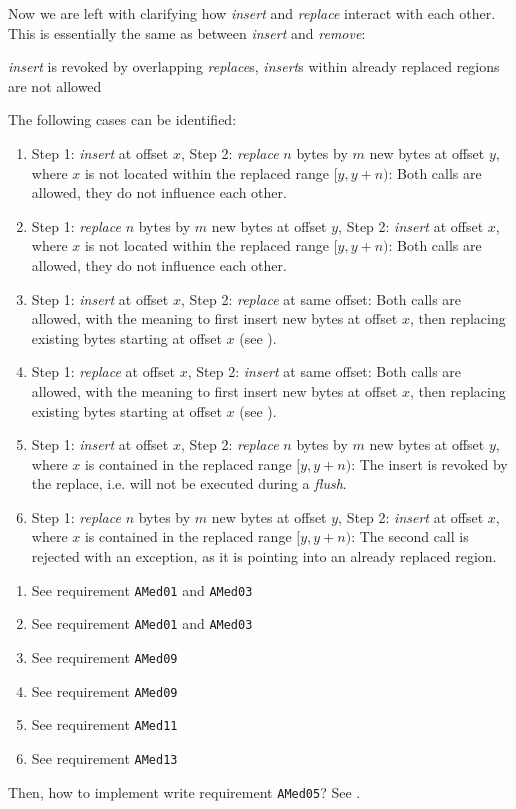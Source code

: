 Now we are left with clarifying how \emph{insert} and \emph{replace} interact with each other. This is essentially the same as between \emph{insert} and \emph{remove}:

{%
\emph{insert} is revoked by overlapping \emph{replace}s, \emph{insert}s within already replaced regions are not allowed
}
{%
The following cases can be identified:
\begin{enumerate}
\item Step 1: \emph{insert} at offset $x$, Step 2: \emph{replace} $n$ bytes by $m$ new bytes at offset $y$, where $x$ is not located within the replaced range $[y,y+n)$: Both calls are allowed, they do not influence each other.
\item Step 1: \emph{replace} $n$ bytes by $m$ new bytes at offset $y$, Step 2: \emph{insert} at offset $x$, where $x$ is not located within the replaced range $[y,y+n)$: Both calls are allowed, they do not influence each other.
\item Step 1: \emph{insert} at offset $x$, Step 2: \emph{replace} at same offset: Both calls are allowed, with the meaning to first insert new bytes at offset $x$, then replacing existing bytes starting at offset $x$ (see ).
\item Step 1: \emph{replace} at offset $x$, Step 2: \emph{insert} at same offset: Both calls are allowed, with the meaning to first insert new bytes at offset $x$, then replacing existing bytes starting at offset $x$ (see ).
\item Step 1: \emph{insert} at offset $x$, Step 2: \emph{replace} $n$ bytes by $m$ new bytes at offset $y$, where $x$ is contained in the replaced range $[y,y+n)$: The insert is revoked by the replace, i.e. will not be executed during a \emph{flush}.
\item Step 1: \emph{replace} $n$ bytes by $m$ new bytes at offset $y$, Step 2: \emph{insert} at offset $x$, where $x$ is contained in the replaced range $[y,y+n)$: The second call is rejected with an exception, as it is pointing into an already replaced region.
\end{enumerate}
}
{%
\begin{enumerate}
\item See requirement \texttt{AMed01} and \texttt{AMed03}
\item See requirement \texttt{AMed01} and \texttt{AMed03}
\item See requirement \texttt{AMed09}
\item See requirement \texttt{AMed09}
\item See requirement \texttt{AMed11}
\item See requirement \texttt{AMed13}
\end{enumerate}
}
{%
Then, how to implement write requirement \texttt{AMed05}? See .
}

